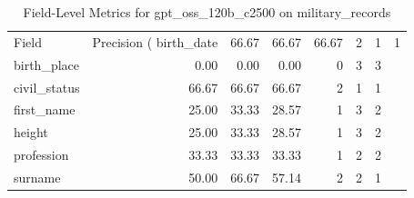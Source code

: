 \begin{table}
\caption{Field-Level Metrics for gpt_oss_120b_c2500 on military_records}
\label{tab:fields_gpt_oss_120b_c2500_military_records}
\begin{tabular}{lrrrrrr}
\toprule
Field & Precision (%
\midrule
birth_date & 66.67 & 66.67 & 66.67 & 2 & 1 & 1 \\
birth_place & 0.00 & 0.00 & 0.00 & 0 & 3 & 3 \\
civil_status & 66.67 & 66.67 & 66.67 & 2 & 1 & 1 \\
first_name & 25.00 & 33.33 & 28.57 & 1 & 3 & 2 \\
height & 25.00 & 33.33 & 28.57 & 1 & 3 & 2 \\
profession & 33.33 & 33.33 & 33.33 & 1 & 2 & 2 \\
surname & 50.00 & 66.67 & 57.14 & 2 & 2 & 1 \\
\bottomrule
\end{tabular}
\end{table}
